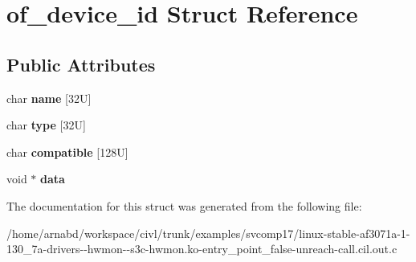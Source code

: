 \hypertarget{structof__device__id}{}\section{of\+\_\+device\+\_\+id Struct Reference}
\label{structof__device__id}
\subsection*{Public Attributes}
\begin{DoxyCompactItemize}
\item 
\hypertarget{structof__device__id_a18206f066086f547a51388d2929ce097}{}char {\bfseries name} \mbox{[}32\+U\mbox{]}\label{structof__device__id_a18206f066086f547a51388d2929ce097}

\item 
\hypertarget{structof__device__id_ac1f0a0648f98e6e2d2a8b4ed64f06c01}{}char {\bfseries type} \mbox{[}32\+U\mbox{]}\label{structof__device__id_ac1f0a0648f98e6e2d2a8b4ed64f06c01}

\item 
\hypertarget{structof__device__id_a5eb442dbc534ae01ff5fba342548fded}{}char {\bfseries compatible} \mbox{[}128\+U\mbox{]}\label{structof__device__id_a5eb442dbc534ae01ff5fba342548fded}

\item 
\hypertarget{structof__device__id_af23b7e38b1d116600b262adc22856f84}{}void $\ast$ {\bfseries data}\label{structof__device__id_af23b7e38b1d116600b262adc22856f84}

\end{DoxyCompactItemize}


The documentation for this struct was generated from the following file\+:\begin{DoxyCompactItemize}
\item 
/home/arnabd/workspace/civl/trunk/examples/svcomp17/linux-\/stable-\/af3071a-\/1-\/130\+\_\+7a-\/drivers-\/-\/hwmon-\/-\/s3c-\/hwmon.\+ko-\/entry\+\_\+point\+\_\+false-\/unreach-\/call.\+cil.\+out.\+c\end{DoxyCompactItemize}
